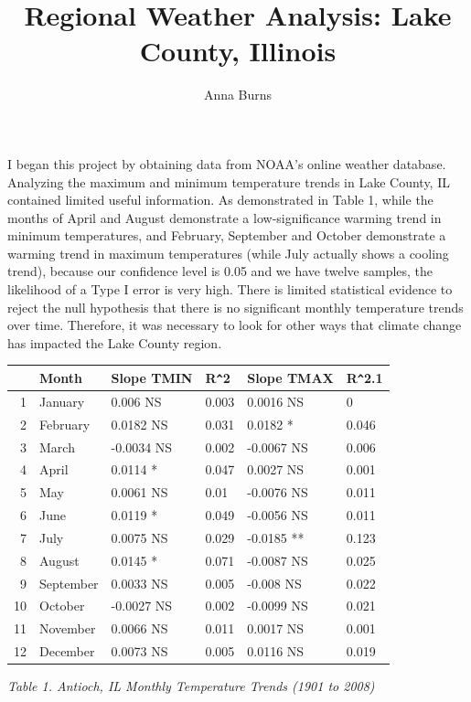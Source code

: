 \documentclass{article}\usepackage[]{graphicx}\usepackage[]{color}
\author{Anna Burns}
\title{Regional Weather Analysis: Lake County, Illinois}
\begin{document}
\maketitle

I began this project by obtaining data from NOAA's online weather database.  Analyzing the maximum and minimum temperature trends in Lake County, IL contained limited useful information.  As demonstrated in Table 1, while the months of April and August demonstrate a low-significance warming trend in minimum temperatures, and February, September and October demonstrate a warming trend in maximum temperatures (while July actually shows a cooling trend), because our confidence level is 0.05 and we have twelve samples, the likelihood of a Type I error is very high.  There is limited statistical evidence to reject the null hypothesis that there is no significant monthly temperature trends over time.  Therefore, it was necessary to look for other ways that climate change has impacted the Lake County region. 

\begin{table}[ht]
\centering
\begin{tabular}{rlllll}
  \hline
 & Month & Slope TMIN & R\verb|^|2 & Slope TMAX & R\verb|^|2.1 \\ 
  \hline
1 & January & 0.006 NS & 0.003 & 0.0016 NS & 0 \\ 
  2 & February & 0.0182 NS & 0.031 & 0.0182 * & 0.046 \\ 
  3 & March & -0.0034 NS & 0.002 & -0.0067 NS & 0.006 \\ 
  4 & April & 0.0114 * & 0.047 & 0.0027 NS & 0.001 \\ 
  5 & May & 0.0061 NS & 0.01 & -0.0076 NS & 0.011 \\ 
  6 & June & 0.0119 * & 0.049 & -0.0056 NS & 0.011 \\ 
  7 & July & 0.0075 NS & 0.029 & -0.0185 ** & 0.123 \\ 
  8 & August & 0.0145 * & 0.071 & -0.0087 NS & 0.025 \\ 
  9 & September & 0.0033 NS & 0.005 & -0.008 NS & 0.022 \\ 
  10 & October & -0.0027 NS & 0.002 & -0.0099 NS & 0.021 \\ 
  11 & November & 0.0066 NS & 0.011 & 0.0017 NS & 0.001 \\ 
  12 & December & 0.0073 NS & 0.005 & 0.0116 NS & 0.019 \\ 
   \hline
\end{tabular}
\end{table}
\emph{Table 1. Antioch, IL Monthly Temperature Trends (1901 to 2008)}
\end{document}
